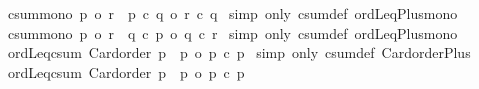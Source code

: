 \begin{isabellebody}
\endisatagproof
{\isafoldproof}%
%
\isadelimproof
\isanewline
%
\endisadelimproof
\isanewline
{}\isamarkupfalse%
\ csum{\isacharunderscore}{\kern0pt}mono{}{\isacharcolon}{\kern0pt}\ {\isachardoublequoteopen}p{}\ {\isasymle}o\ r{}\ {\isasymLongrightarrow}\ p{}\ {\isacharplus}{\kern0pt}c\ q\ {\isasymle}o\ r{}\ {\isacharplus}{\kern0pt}c\ q{\isachardoublequoteclose}\isanewline
%
\isadelimproof
%
\endisadelimproof
%
\isatagproof
{}\isamarkupfalse%
\ {\isacharparenleft}{\kern0pt}simp\ only{\isacharcolon}{\kern0pt}\ csum{\isacharunderscore}{\kern0pt}def\ ordLeq{\isacharunderscore}{\kern0pt}Plus{\isacharunderscore}{\kern0pt}mono{}{\isacharparenright}{\kern0pt}%
\endisatagproof
{\isafoldproof}%
%
\isadelimproof
\isanewline
%
\endisadelimproof
\isanewline
{}\isamarkupfalse%
\ csum{\isacharunderscore}{\kern0pt}mono{}{\isacharcolon}{\kern0pt}\ {\isachardoublequoteopen}p{}\ {\isasymle}o\ r{}\ {\isasymLongrightarrow}\ q\ {\isacharplus}{\kern0pt}c\ p{}\ {\isasymle}o\ q\ {\isacharplus}{\kern0pt}c\ r{}{\isachardoublequoteclose}\isanewline
%
\isadelimproof
%
\endisadelimproof
%
\isatagproof
{}\isamarkupfalse%
\ {\isacharparenleft}{\kern0pt}simp\ only{\isacharcolon}{\kern0pt}\ csum{\isacharunderscore}{\kern0pt}def\ ordLeq{\isacharunderscore}{\kern0pt}Plus{\isacharunderscore}{\kern0pt}mono{}{\isacharparenright}{\kern0pt}%
\endisatagproof
{\isafoldproof}%
%
\isadelimproof
\isanewline
%
\endisadelimproof
\isanewline
{}\isamarkupfalse%
\ ordLeq{\isacharunderscore}{\kern0pt}csum{}{\isacharcolon}{\kern0pt}\ {\isachardoublequoteopen}Card{\isacharunderscore}{\kern0pt}order\ p{}\ {\isasymLongrightarrow}\ p{}\ {\isasymle}o\ p{}\ {\isacharplus}{\kern0pt}c\ p{}{\isachardoublequoteclose}\isanewline
%
\isadelimproof
%
\endisadelimproof
%
\isatagproof
{}\isamarkupfalse%
\ {\isacharparenleft}{\kern0pt}simp\ only{\isacharcolon}{\kern0pt}\ csum{\isacharunderscore}{\kern0pt}def\ Card{\isacharunderscore}{\kern0pt}order{\isacharunderscore}{\kern0pt}Plus{}{\isacharparenright}{\kern0pt}%
\endisatagproof
{\isafoldproof}%
%
\isadelimproof
\isanewline
%
\endisadelimproof
\isanewline
{}\isamarkupfalse%
\ ordLeq{\isacharunderscore}{\kern0pt}csum{}{\isacharcolon}{\kern0pt}\ {\isachardoublequoteopen}Card{\isacharunderscore}{\kern0pt}order\ p{}\ {\isasymLongrightarrow}\ p{}\ {\isasymle}o\ p{}\ {\isacharplus}{\kern0pt}c\ p{}{\isachardoublequoteclose}\isanewline

\end{isabellebody}
